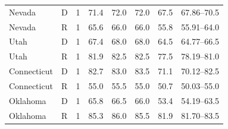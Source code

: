 \begin{tabular}{llcrrrrr}
Nevada & D & 1 & 71.4 & 72.0 & 72.0 & 67.5 & 67.86--70.5 \\
Nevada & R & 1 & 65.6 & 66.0 & 66.0 & 55.8 & 55.91--64.0 \\
Utah & D & 1 & 67.4 & 68.0 & 68.0 & 64.5 & 64.77--66.5 \\
Utah & R & 1 & 81.9 & 82.5 & 82.5 & 77.5 & 78.19--81.0 \\
Connecticut & D & 1 & 82.7 & 83.0 & 83.5 & 71.1 & 70.12--82.5 \\
Connecticut & R & 1 & 55.0 & 55.5 & 55.0 & 50.7 & 50.03--55.0 \\
Oklahoma & D & 1 & 65.8 & 66.5 & 66.0 & 53.4 & 54.19--63.5 \\
Oklahoma & R & 1 & 85.3 & 86.0 & 85.5 & 81.9 & 81.70--83.5 \\
\bottomrule
\end{tabular}

